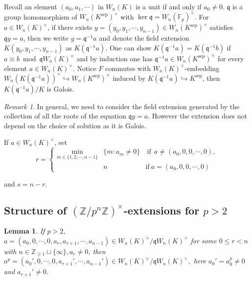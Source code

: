 \documentclass{proc-l}
\newtheorem{lemma}[theorem]{Lemma}
\theoremstyle{definition}
\theoremstyle{remark}
\newtheorem{remark}[theorem]{Remark}
\numberwithin{equation}{section}
\DeclareMathOperator{\sep}{sep}
\begin{document}
{Recall an element $(a_0,a_1,\cdots)$ in $W_n(K)$ is a unit if and only if $a_0\neq0$. $\mathfrak q$ is a group homomorphism of $W_n(K^{\sep})^\times$ with $\ker\mathfrak q=W_n(\mathbb F_p)^\times$. For $a\in W_n(K)^\times$, if there exists $y=(y_0,y_1,\cdots,y_{n-1})\in W_n(K^{\sep})^\times$ satisfies $\mathfrak qy=a$, then we write $y=\mathfrak q^{-1}a$ and denote the field extension $K(y_0,y_1,\cdots,y_{n-1})$ as $K(\mathfrak q^{-1}a)$. One can show $K(\mathfrak q^{-1}a)= K(\mathfrak q^{-1}b)$ if $a\equiv b\bmod \mathfrak qW_n(K)^\times$ and by induction one has $\mathfrak q^{-1}a\in W_n(K^{\sep})^\times$ for every element $a\in W_n(K)^\times$. Notice $F$ commutes with $W_n(K)^\times$-embedding $W_n( K(\mathfrak q^{-1}a))^\times\hookrightarrow W_n(K^{\sep})^\times$ induced by $K(\mathfrak q^{-1}a)\hookrightarrow {K^{\sep}}$, then $K(\mathfrak q^{-1}a)/K$ is Galois. %






\begin{remark}
    In general, we need to consider the field extension generated by the collection of all the roots of the equation $\mathfrak qy=a$. However the extension does not depend on the choice of solution as it is Galois.
\end{remark}



If $a\in W_n(K)^\times$, set 
\begin{equation*}\tag{*}
r={\left\{
\begin{aligned}
    \min\limits_{m\in\{1,2,\cdots,n-1\}}&\{m: a_m\neq0\}&~\text{if}~~a\neq(a_0,0,0,\cdots,0),\\
&n&\text{if} ~a=(a_0,0,0,\cdots,0)
\end{aligned}
\right.}
\end{equation*}

and $s=n-r$. 
\subsection{Structure of $(\mathbb Z/p^n\mathbb Z)^\times$-extensions for $p>2$}\label{3.1}
\begin{lemma}\label{thm-1}
If $p>2$, $a=(a_0,0,\cdots,0,a_r,a_{r+1},\cdots,a_{n-1})\in W_n(K)^\times/\mathfrak qW_n(K)^\times$ for some $0\leq r< n$ with $n\in\mathbb Z_{\geq1}\sqcup\{\infty\},a_r\neq0$, then $a^p=(a_0',0,\cdots,0,a_{r+1}',\cdots,a_{n-1}')\in W_n(K)^\times/\mathfrak qW_n(K)^\times,$ here $a_0'=a_0^p\neq0$ and $a_{r+1}'\neq0$. 



\end{lemma}}
\end{document}
